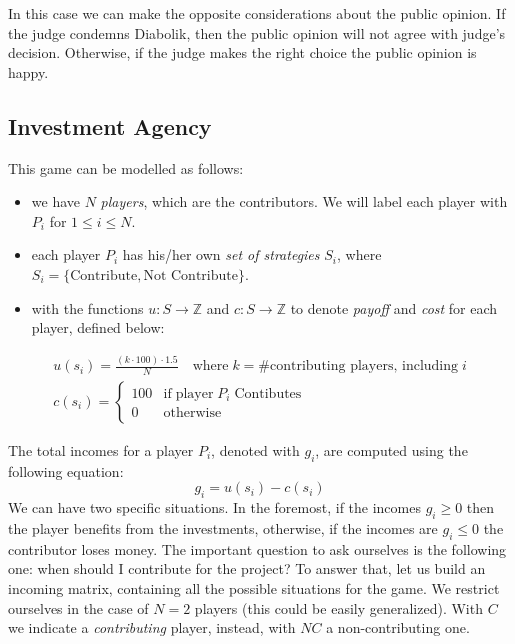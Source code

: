 \documentclass{article}
\begin{document}
\noindent In this case we can make the opposite considerations about the public opinion. If the judge condemns Diabolik, then the public opinion
will not agree with judge's decision. Otherwise, if the judge makes the right choice the public opinion is happy.

\subsection{Investment Agency}

This game can be modelled as follows:
\begin{itemize}
    \item we have $N$ \textit{players}, which are the contributors. We will label each player with $P_i$ for $1 \le i \le N$.
    \item each player $P_i$ has his/her own \textit{set of strategies} $S_i$, where $S_i = \{\textrm{Contribute}, \textrm{Not Contribute}\}$.
    \item with the functions $u: S \to \mathbb{Z}$ and $c: S \to \mathbb{Z}$ to denote \textit{payoff} and \textit{cost} for each player, defined below:
\end{itemize}

\begin{gather*}
    u(s_i) = \frac{(k \cdot 100) \cdot 1.5}{N} \quad \textrm{where} \; k = \#\textrm{contributing players, including} \; i \\
    c(s_i) = \begin{cases}
        100 & \textrm{if} \; \textrm{player} \; P_i \; \textrm{Contibutes} \\
        0 & \textrm{otherwise}
    \end{cases}
\end{gather*}

\noindent The total incomes for a player $P_i$, denoted with $g_i$, are computed using the following equation:
\begin{equation*}
    g_i = u(s_i) - c(s_i)
\end{equation*}
We can have two specific situations. In the foremost, if the incomes $g_i \ge 0$ then the player benefits from the investments, otherwise, if the incomes
are $g_i \le 0$ the contributor loses money. The important question to ask ourselves is the following one: when should I contribute for the project?
To answer that, let us build an incoming matrix, containing all the possible situations for the game. We restrict ourselves in the case of $N=2$ players (this could be easily generalized).
With $C$ we indicate a \textit{contributing} player, instead, with $NC$ a non-contributing one.
\end{document}

